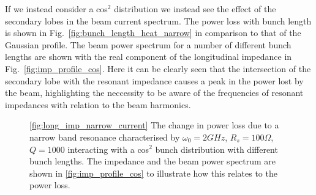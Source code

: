 If we instead consider a cos$^{2}$ distribution we instead see the effect of the secondary lobes in the beam current spectrum. The power loss with bunch length is shown in Fig.~\ref{fig:bunch_length_heat_narrow} in comparison to that of the Gaussian profile. The beam power spectrum for a number of different bunch lengths are shown with the real component of the longitudinal impedance in Fig.~\ref{fig:imp_profile_cos}. Here it can be clearly seen that the intersection of the secondary lobe with the resonant impedance causes a peak in the power lost by the beam, highlighting the neccessity to be aware of the frequencies of resonant impedances with relation to the beam harmonics.


\begin{figure}
\caption{\ref{fig:long_imp_narrow_current} The change in power loss due to a narrow band resonance characterised by $\omega_{0} = 2GHz$, $R_{s} = 100\Omega$, $Q = 1000$ interacting with a cos$^{2}$ bunch distribution with different bunch lengths. The impedance and the beam power spectrum are shown in \ref{fig:imp_profile_cos} to illustrate how this relates to the power loss.}
\end{figure}

